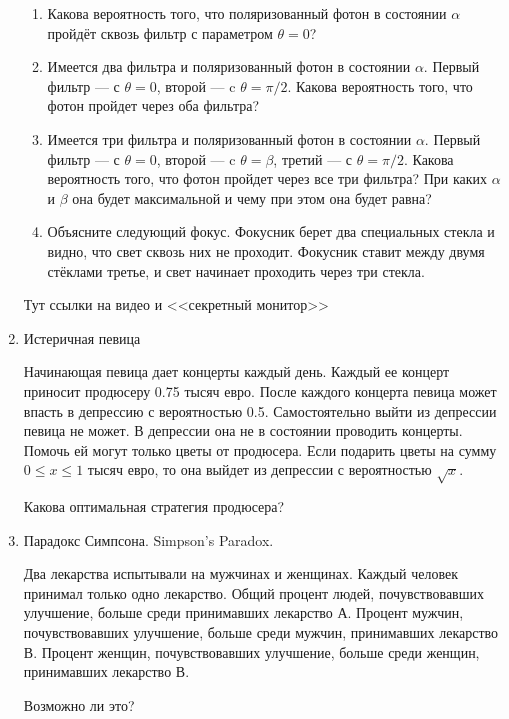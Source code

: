 \documentclass[12pt,a4paper]{article}
\begin{document}
\begin{enumerate}
\begin{enumerate}
\item Какова вероятность того, что поляризованный фотон в состоянии $\alpha$ пройдёт сквозь фильтр с параметром $\theta=0$?
\item Имеется два фильтра и поляризованный фотон в состоянии $\alpha$. Первый фильтр --- с $\theta=0$, второй --- c $\theta=\pi/2$. Какова вероятность того, что фотон пройдет через оба фильтра?
\item Имеется три фильтра и поляризованный фотон в состоянии $\alpha$. Первый фильтр --- с $\theta=0$, второй --- c $\theta=\beta$, третий --- с $\theta=\pi/2$. Какова вероятность того, что фотон пройдет через все три фильтра? При каких $\alpha$ и $\beta$ она будет максимальной и чему при этом она будет равна?
\item Объясните следующий фокус. Фокусник берет два специальных стекла и видно, что свет сквозь них не проходит. Фокусник ставит между двумя стёклами третье, и свет начинает проходить через три стекла. 
\end{enumerate}

Тут ссылки на видео и <<секретный монитор>>

\item Истеричная певица

Начинающая певица дает концерты каждый день. Каждый ее концерт приносит продюсеру 0.75 тысяч евро. После каждого концерта певица может впасть в депрессию с вероятностью 0.5. Самостоятельно выйти из депрессии певица не может. В депрессии она не в состоянии проводить концерты. Помочь ей могут только цветы от продюсера. Если подарить цветы на сумму $0\le x\le 1$ тысяч евро, то она выйдет из депрессии с вероятностью $\sqrt{x}$. 

Какова оптимальная стратегия продюсера? 

\item Парадокс Симпсона.  Simpson's Paradox.

Два лекарства испытывали на мужчинах и женщинах. Каждый
человек принимал только одно лекарство. Общий процент людей,
почувствовавших улучшение, больше среди принимавших лекарство А.
Процент мужчин, почувствовавших улучшение, больше среди мужчин, принимавших лекарство В. Процент женщин, почувствовавших улучшение, больше среди женщин, принимавших лекарство В. 

Возможно ли это? 


\end{enumerate}
\end{document}
